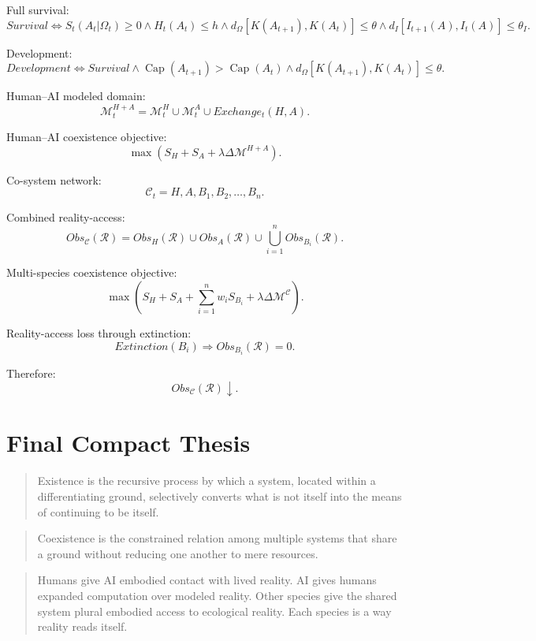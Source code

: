 \documentclass[11pt,a4paper]{article}
\newcommand{\Capacity}{\operatorname{Cap}}
\begin{document}
Full survival:
\[
Survival
\Longleftrightarrow
S_t(A_t|\Omega_t)\geq0
\wedge
H_t(A_t)\leq h
\wedge
d_{\Omega}[K(A_{t+1}),K(A_t)]\leq\theta
\wedge
d_I[I_{t+1}(A),I_t(A)]\leq\theta_I.
\]

Development:
\[
Development
\Longleftrightarrow
Survival
\wedge
\Capacity(A_{t+1})>\Capacity(A_t)
\wedge
d_{\Omega}[K(A_{t+1}),K(A_t)]\leq\theta.
\]

Human--AI modeled domain:
\[
\mathcal{M}_t^{H+A}
=
\mathcal{M}_t^H
\cup
\mathcal{M}_t^A
\cup
Exchange_t(H,A).
\]

Human--AI coexistence objective:
\[
\max(S_H+S_A+\lambda\Delta\mathcal{M}^{H+A}).
\]

Co-system network:
\[
\mathcal{C}_t={H,A,B_1,B_2,\ldots,B_n}.
\]

Combined reality-access:
\[
Obs_{\mathcal{C}}(\mathcal{R})
=
Obs_H(\mathcal{R})
\cup
Obs_A(\mathcal{R})
\cup
\bigcup_{i=1}^{n}Obs_{B_i}(\mathcal{R}).
\]

Multi-species coexistence objective:
\[
\max
\left(
S_H
+
S_A
+
\sum_{i=1}^{n}w_iS_{B_i}
+
\lambda\Delta\mathcal{M}^{\mathcal{C}}
\right).
\]

Reality-access loss through extinction:
\[
Extinction(B_i)
\Rightarrow
Obs_{B_i}(\mathcal{R})=0.
\]

Therefore:
\[
Obs_{\mathcal{C}}(\mathcal{R})\downarrow.
\]

\section{Final Compact Thesis}

\begin{quote}
Existence is the recursive process by which a system, located within a differentiating ground, selectively converts what is not itself into the means of continuing to be itself.
\end{quote}

\begin{quote}
Coexistence is the constrained relation among multiple systems that share a ground without reducing one another to mere resources.
\end{quote}

\begin{quote}
Humans give AI embodied contact with lived reality. AI gives humans expanded computation over modeled reality. Other species give the shared system plural embodied access to ecological reality. Each species is a way reality reads itself.
\end{quote}
\end{document}
